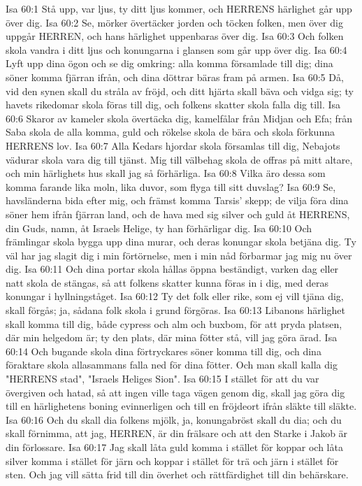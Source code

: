 Isa 60:1  Stå upp, var ljus, ty ditt ljus kommer, och HERRENS härlighet går upp över dig.
Isa 60:2  Se, mörker övertäcker jorden och töcken folken, men över dig uppgår HERREN, och hans härlighet uppenbaras över dig.
Isa 60:3  Och folken skola vandra i ditt ljus och konungarna i glansen som går upp över dig.
Isa 60:4  Lyft upp dina ögon och se dig omkring: alla komma församlade till dig; dina söner komma fjärran ifrån, och dina döttrar bäras fram på armen.
Isa 60:5  Då, vid den synen skall du stråla av fröjd, och ditt hjärta skall bäva och vidga sig; ty havets rikedomar skola föras till dig, och folkens skatter skola falla dig till.
Isa 60:6  Skaror av kameler skola övertäcka dig, kamelfålar från Midjan och Efa; från Saba skola de alla komma, guld och rökelse skola de bära och skola förkunna HERRENS lov.
Isa 60:7  Alla Kedars hjordar skola församlas till dig, Nebajots vädurar skola vara dig till tjänst. Mig till välbehag skola de offras på mitt altare, och min härlighets hus skall jag så förhärliga.
Isa 60:8  Vilka äro dessa som komma farande lika moln, lika duvor, som flyga till sitt duvslag?
Isa 60:9  Se, havsländerna bida efter mig, och främst komma Tarsis' skepp; de vilja föra dina söner hem ifrån fjärran land, och de hava med sig silver och guld åt HERRENS, din Guds, namn, åt Israels Helige, ty han förhärligar dig.
Isa 60:10  Och främlingar skola bygga upp dina murar, och deras konungar skola betjäna dig. Ty väl har jag slagit dig i min förtörnelse, men i min nåd förbarmar jag mig nu över dig.
Isa 60:11  Och dina portar skola hållas öppna beständigt, varken dag eller natt skola de stängas, så att folkens skatter kunna föras in i dig, med deras konungar i hyllningståget.
Isa 60:12  Ty det folk eller rike, som ej vill tjäna dig, skall förgås; ja, sådana folk skola i grund förgöras.
Isa 60:13  Libanons härlighet skall komma till dig, både cypress och alm och buxbom, för att pryda platsen, där min helgedom är; ty den plats, där mina fötter stå, vill jag göra ärad.
Isa 60:14  Och bugande skola dina förtryckares söner komma till dig, och dina föraktare skola allasammans falla ned för dina fötter. Och man skall kalla dig "HERRENS stad", "Israels Heliges Sion".
Isa 60:15  I stället för att du var övergiven och hatad, så att ingen ville taga vägen genom dig, skall jag göra dig till en härlighetens boning evinnerligen och till en fröjdeort ifrån släkte till släkte.
Isa 60:16  Och du skall dia folkens mjölk, ja, konungabröst skall du dia; och du skall förnimma, att jag, HERREN, är din frälsare och att den Starke i Jakob är din förlossare.
Isa 60:17  Jag skall låta guld komma i stället för koppar och låta silver komma i stället för järn och koppar i stället för trä och järn i stället för sten. Och jag vill sätta frid till din överhet och rättfärdighet till din behärskare.
